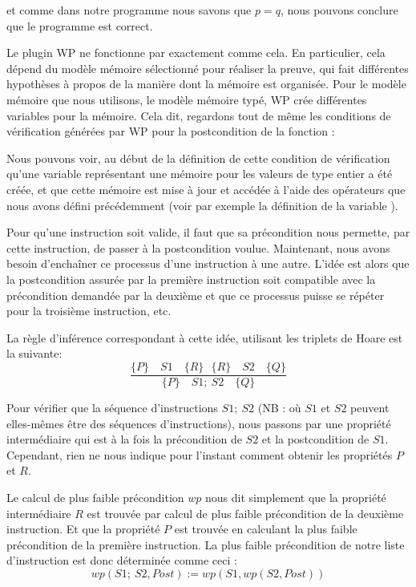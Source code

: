 et comme dans notre programme nous savons que $p = q$, nous pouvons conclure que
le programme est correct.


Le plugin WP ne fonctionne par exactement comme cela. En particulier, cela dépend du
modèle mémoire sélectionné pour réaliser la preuve, qui fait différentes hypothèses à
propos de la manière dont la mémoire est organisée. Pour le modèle mémoire que nous 
utilisons, le modèle mémoire typé, WP crée différentes variables pour la mémoire.
Cela dit, regardons tout de même les conditions de vérification générées par WP pour la
postcondition de la fonction  :



Nous pouvons voir, au début de la définition de cette condition de vérification qu'une
variable  représentant une mémoire pour les valeurs de type entier
a été créée, et que cette mémoire est mise à jour et accédée à l'aide des opérateurs que
nous avons défini précédemment (voir par exemple la définition de la variable
).




Pour qu'une instruction soit valide, il faut que sa précondition nous 
permette, par cette instruction, de passer à la postcondition voulue. 
Maintenant, nous avons besoin d'enchaîner ce processus d'une 
instruction à une autre. L'idée est alors que la postcondition assurée par la
première instruction soit compatible avec la précondition demandée par la 
deuxième et que ce processus puisse se répéter pour la troisième instruction, 
etc.



La règle d'inférence correspondant à cette idée, utilisant les triplets de 
Hoare est la suivante:
$$\dfrac{\{P\}\quad S1 \quad \{R\} \ \ \ \{R\}\quad S2 \quad \{Q\}}{\{P\}\quad S1 ;\ S2 \quad \{Q\}}$$



Pour vérifier que la séquence d'instructions $S1;\ S2$ (NB : où $S1$ et $S2$ 
peuvent elles-mêmes être des séquences d'instructions), nous passons par une 
propriété intermédiaire qui est à la fois la précondition de $S2$ et la 
postcondition de $S1$. Cependant, rien ne nous indique pour l'instant 
comment obtenir les propriétés $P$ et $R$.



Le calcul de plus faible précondition $wp$ nous dit simplement que la 
propriété intermédiaire $R$ est trouvée par calcul de plus faible précondition
de la deuxième instruction. Et que la propriété $P$ est trouvée en calculant la
plus faible précondition de la première instruction. La plus faible précondition
de notre liste d'instruction est donc déterminée comme ceci :
$$wp(S1;\ S2 , Post) := wp(S1, wp(S2, Post) )$$



